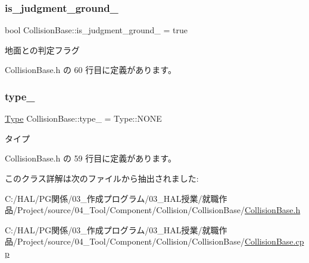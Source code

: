 \mbox{\label{class_collision_base_acc56eed7a6366d77bb2b80810f0a4ea7}} 
\subsubsection{\texorpdfstring{is\+\_\+judgment\+\_\+ground\+\_\+}{is\_judgment\_ground\_}}
{\footnotesize\ttfamily bool Collision\+Base\+::is\+\_\+judgment\+\_\+ground\+\_\+ = true\hspace{0.3cm}{\ttfamily [private]}}



地面との判定フラグ 



 Collision\+Base.\+h の 60 行目に定義があります。

\mbox{\label{class_collision_base_a254487778b15b900d763ebf0bf153c3e}} 
\subsubsection{\texorpdfstring{type\+\_\+}{type\_}}
{\footnotesize\ttfamily \mbox{\hyperlink{class_collision_base_a18dc0d5461742083ca12013fe9ff1a20}{Type}} Collision\+Base\+::type\+\_\+ = Type\+::\+N\+O\+NE\hspace{0.3cm}{\ttfamily [private]}}



タイプ 



 Collision\+Base.\+h の 59 行目に定義があります。



このクラス詳解は次のファイルから抽出されました\+:\begin{DoxyCompactItemize}
\item 
C\+:/\+H\+A\+L/\+P\+G関係/03\+\_\+作成プログラム/03\+\_\+\+H\+A\+L授業/就職作品/\+Project/source/04\+\_\+\+Tool/\+Component/\+Collision/\+Collision\+Base/\mbox{\hyperlink{_collision_base_8h}{Collision\+Base.\+h}}\item 
C\+:/\+H\+A\+L/\+P\+G関係/03\+\_\+作成プログラム/03\+\_\+\+H\+A\+L授業/就職作品/\+Project/source/04\+\_\+\+Tool/\+Component/\+Collision/\+Collision\+Base/\mbox{\hyperlink{_collision_base_8cpp}{Collision\+Base.\+cpp}}\end{DoxyCompactItemize}
